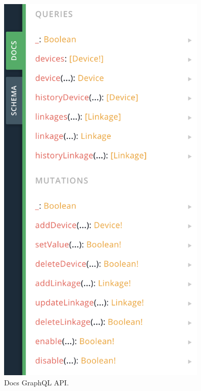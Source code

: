 \begin{figure}[ht!]
  \centering
  \includegraphics[width=10cm]{imagenes/desarrollo/web/api/graphql_docs}
  \caption{Docs GraphQL API.}
  \label{fig:graphql-docs}
\end{figure}

